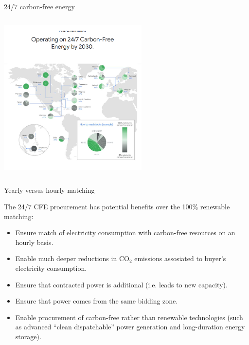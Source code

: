 \begin{frame}{24/7 carbon-free energy}
\begin{columns}[T]
  \begin{column}{8cm}
    \centering
    \includegraphics[width=7.5cm]{images/247-google-web.png}
    \vspace{.1cm}
  \end{column}

  \end{columns}
  
\end{frame}



\begin{frame}{Yearly versus hourly matching}
  
  The 24/7 CFE procurement has potential benefits over the 100\% renewable matching:
  
  \begin{itemize}
  \item Ensure match of electricity consumption with carbon-free resources 
        on an \alert{hourly basis}.
  \item Enable much \alert{deeper reductions in CO$_2$} emissions assosiated 
        to buyer's electricity consumption.
  \item Ensure that contracted power is \alert{additional} (i.e. leads to new capacity).
  \item Ensure that power comes from the \alert{same bidding zone}.
  \item Enable procurement of \alert{carbon-free} rather than renewable technologies 
        (such as advanced “clean dispatchable” power generation and long-duration energy storage).
  \end{itemize}
  
\end{frame}



